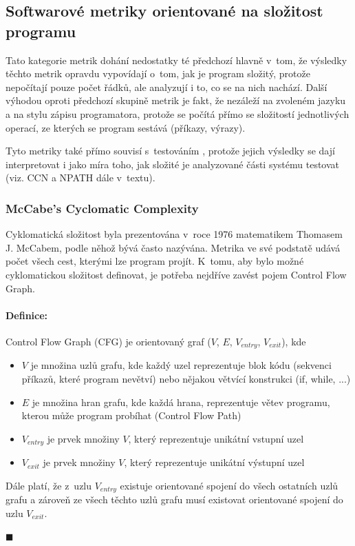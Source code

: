 \documentclass[11pt,twoside,a4paper]{book}
\begin{document}
\subsection{Softwarové metriky orientované na složitost programu}
Tato kategorie metrik dohání nedostatky té předchozí hlavně v~tom, že výsledky těchto metrik
opravdu vypovídají o~tom, jak je program složitý, protože nepočítají pouze počet řádků, ale analyzují
i to, co se na nich nachází. Další výhodou oproti předchozí skupině metrik je fakt, že
nezáleží na zvoleném jazyku a na stylu zápisu programatora, protože se počítá přímo se složitostí
jednotlivých operací, ze kterých se program sestává (příkazy, výrazy).

Tyto metriky také přímo souvisí s~testováním \cite{MCCABEWHATSON96}, protože jejich výsledky se dají interpretovat i jako míra toho,
jak složité je analyzované části systému testovat (viz. CCN a NPATH dále v~textu).

\subsubsection{McCabe’s Cyclomatic Complexity}
\label{sec:CCN}
Cyklomatická složitost byla prezentována v~roce 1976 matematikem Thomasem J. McCabem, podle něhož bývá často nazývána.
Metrika ve své podstatě udává počet všech cest, kterými lze program projít. K~tomu, aby bylo možné cyklomatickou složitost
definovat, je potřeba nejdříve zavést pojem Control Flow Graph.

\paragraph{Definice:}\cite{NPATH,CCN} Control Flow Graph (CFG) je orientovaný graf ($V$, $E$, $V_{entry}$, $V_{exit}$), kde
\begin{itemize}
 \item $V$ je množina uzlů grafu, kde každý uzel reprezentuje blok kódu (sekvenci příkazů, které program nevětví) nebo nějakou větvící konstrukci (if, while, ...)
 \item $E$ je množina hran grafu, kde každá hrana, reprezentuje větev programu, kterou může program probíhat (Control Flow Path)
 \item $V_{entry}$ je prvek množiny $V$, který reprezentuje unikátní vstupní uzel
 \item $V_{exit}$ je prvek množiny $V$, který reprezentuje unikátní výstupní uzel
\end{itemize}
Dále platí, že z~uzlu $V_{entry}$ existuje orientované spojení do všech ostatních uzlů grafu a zároveň ze všech těchto uzlů grafu
musí existovat orientované spojení do uzlu $V_{exit}$.
\begin{flushright}$\blacksquare$\end{flushright}
\end{document}
